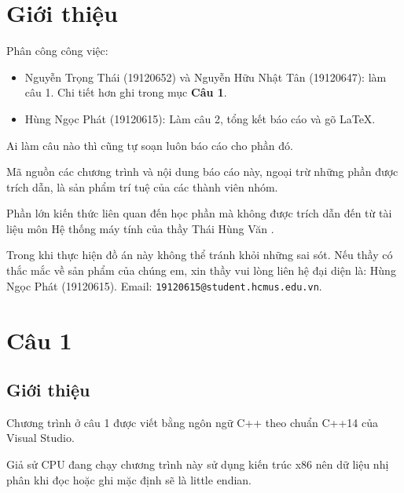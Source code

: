 \documentclass[12pt, final]{article}
\newcommand{\code}[1]{\texttt{#1}}
\begin{document}
\section{Giới thiệu}
Phân công công việc:
\begin{itemize}
    \item Nguyễn Trọng Thái (19120652) và Nguyễn Hữu Nhật Tân (19120647): làm câu 1. Chi tiết hơn ghi trong mục \textbf{Câu 1}.
    \item Hùng Ngọc Phát (19120615): Làm câu 2, tổng kết báo cáo và gõ LaTeX.
\end{itemize}
Ai làm câu nào thì cũng tự soạn luôn báo cáo cho phần đó.

Mã nguồn các chương trình và nội dung báo cáo này, ngoại trừ những phần được trích dẫn, là sản phẩm trí tuệ của các thành viên nhóm.

Phần lớn kiến thức liên quan đến học phần mà không được trích dẫn đến từ tài liệu môn Hệ thống máy tính của thầy Thái Hùng Văn \cite{thaihungvan}.

Trong khi thực hiện đồ án này không thể tránh khỏi những sai sót. Nếu thầy có thắc mắc về sản phẩm của chúng em, xin thầy vui lòng liên hệ đại diện là: Hùng Ngọc Phát (19120615). Email: \code{19120615@student.hcmus.edu.vn}.

\section{Câu 1}
\subsection{Giới thiệu}
Chương trình ở câu 1 được viết bằng ngôn ngữ C++ theo chuẩn C++14 của Visual Studio. \par 
Giả sử CPU đang chạy chương trình này sử dụng kiến trúc x86 nên dữ liệu nhị phân khi đọc hoặc ghi mặc định sẽ là little endian.
\end{document}
